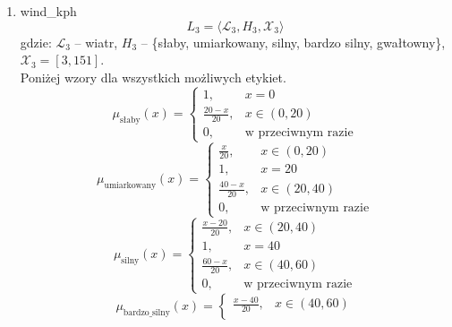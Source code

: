 \documentclass{article}
\begin{document}
\begin{enumerate}
    \item wind\_kph
        \begin{equation}
            L_3 = \langle \mathcal{L}_3, H_3, \mathcal{X}_3 \rangle
        \end{equation}
        gdzie: $\mathcal{L}_3$ – wiatr, $H_3$ – \{słaby, umiarkowany, silny, bardzo silny, gwałtowny\}, $\mathcal{X}_3 = [3, 151]$. \\
        Poniżej wzory dla wszystkich możliwych etykiet.
                  \begin{equation}
                    \mu_{\text{słaby}}(x) =
                    \begin{cases}
                    1, & x = 0 \\
                    \frac{20 - x}{20}, & x \in (0, 20) \\
                    0, & \text{w przeciwnym razie}
                    \end{cases}
                  \end{equation}
                \begin{equation}
                    \mu_{\text{umiarkowany}}(x) =
                    \begin{cases}
                    \frac{x}{20}, & x \in (0, 20) \\
                    1, & x = 20 \\
                    \frac{40 - x}{20}, & x \in (20, 40) \\
                    0, & \text{w przeciwnym razie}
                    \end{cases}
                  \end{equation}
                \begin{equation}
                    \mu_{\text{silny}}(x) =
                    \begin{cases}
                    \frac{x - 20}{20}, & x \in (20, 40) \\
                    1, & x = 40 \\
                    \frac{60 - x}{20}, & x \in (40, 60) \\
                    0, & \text{w przeciwnym razie}
                    \end{cases}
              \end{equation}
                \begin{equation}
                    \mu_{\text{bardzo\_silny}}(x) =
                    \begin{cases}
                    \frac{x - 40}{20}, & x \in (40, 60) \\

\end{cases}
\end{equation}
\end{enumerate}
\end{document}
